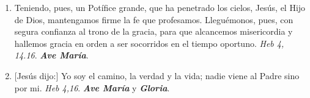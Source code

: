 \documentclass[../../devocionario.tex]{subfiles}
\begin{document}
\begin{enumerate}
        \item Teniendo, pues, un Potífice grande, que ha penetrado los cielos, Jesús, el Hijo de Dios, mantengamos firme la fe que profesamos. Lleguémonos, pues, 
            con segura confianza al trono de la gracia, para que alcancemos misericordia y hallemos gracia en orden a ser socorridos en el tiempo oportuno. 
            \emph{Heb 4, 14.16}. \textbf{\emph{Ave María}}.

        \item {[Jesús dijo:]} Yo soy el camino, la verdad y la vida; nadie viene al Padre sino por mi. \emph{Heb 4,16}. \textbf{\emph{Ave María}} y \textbf{\emph{Gloria}}.

    \end{enumerate}
\end{document}

